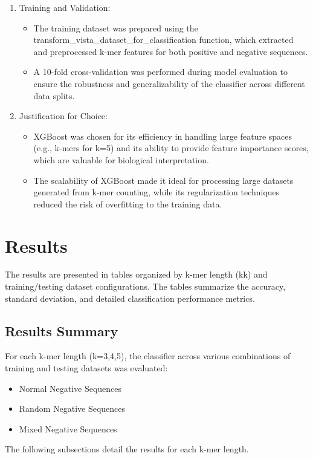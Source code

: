 \documentclass[11pt, a4paper, hidelinks]{article}
\begin{document}
\begin{enumerate}
\begin{itemize}
    \end{itemize}
    
    \item Training and Validation:
    \begin{itemize}
        \item The training dataset was prepared using the transform\_vista\_dataset\_for\_classification function, which extracted and preprocessed k-mer features for both positive and negative sequences.
        \item A 10-fold cross-validation was performed during model evaluation to ensure the robustness and generalizability of the classifier across different data splits.
    \end{itemize}
    
    \item Justification for Choice:
    \begin{itemize}
        \item XGBoost was chosen for its efficiency in handling large feature spaces (e.g., k-mers for k=5) and its ability to provide feature importance scores, which are valuable for biological interpretation.
        \item The scalability of XGBoost made it ideal for processing large datasets generated from k-mer counting, while its regularization techniques reduced the risk of overfitting to the training data.
    \end{itemize}

\end{enumerate}

\section{Results}\label{sec:results}

The results are presented in tables organized by k-mer length (kk) and training/testing dataset configurations. The tables summarize the accuracy, standard deviation, and detailed classification performance metrics.

\subsection{Results Summary}\label{subsec:results-summary}
For each k-mer length (k=3,4,5), the classifier across various combinations of training and testing datasets was evaluated:

\begin{itemize}
    \item Normal Negative Sequences
    \item Random Negative Sequences
    \item Mixed Negative Sequences
\end{itemize}
The following subsections detail the results for each k-mer length.
\end{document}
